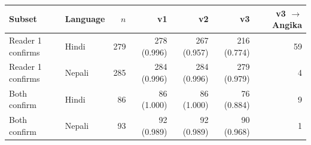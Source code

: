 \begin{tabular}{llrrrrr}
\toprule
Subset & Language & $n$ & v1 & v2 & v3 & v3 $\to$ Angika \\
\midrule
Reader 1 confirms & Hindi & 279 & 278 (0.996) & 267 (0.957) & 216 (0.774) & 59 \\
Reader 1 confirms & Nepali & 285 & 284 (0.996) & 284 (0.996) & 279 (0.979) & 4 \\
Both confirm & Hindi & 86 & 86 (1.000) & 86 (1.000) & 76 (0.884) & 9 \\
Both confirm & Nepali & 93 & 92 (0.989) & 92 (0.989) & 90 (0.968) & 1 \\
\bottomrule
\end{tabular}
